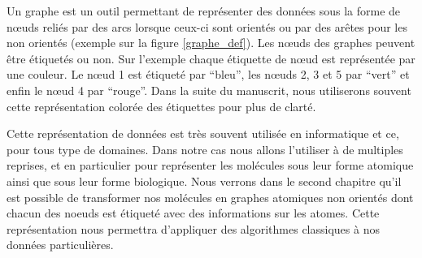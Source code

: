 Un graphe est un outil permettant de représenter des données sous la forme de n\oe{}uds reliés par des arcs lorsque ceux-ci sont orientés ou par des arêtes pour les non orientés (exemple sur la figure \ref{graphe_def}).
Les n\oe{}uds des graphes peuvent être étiquetés ou non.
Sur l'exemple chaque étiquette de n\oe{}ud est représentée par une couleur.
Le n\oe{}ud 1 est étiqueté par ``bleu'', les n\oe{}uds 2, 3 et 5 par ``vert'' et enfin le n\oe{}ud 4 par ``rouge''.
Dans la suite du manuscrit, nous utiliserons souvent cette représentation colorée des étiquettes pour plus de clarté.

Cette représentation de données est très souvent utilisée en informatique et ce, pour tous type de domaines.
Dans notre cas nous allons l'utiliser à de multiples reprises, et en particulier pour représenter les molécules sous leur forme atomique ainsi que sous leur forme biologique.
Nous verrons dans le second chapitre qu'il est possible de transformer nos molécules en graphes atomiques non orientés dont chacun des noeuds est étiqueté avec des informations sur les atomes.
Cette représentation nous permettra d'appliquer des algorithmes classiques à nos données particulières.





























